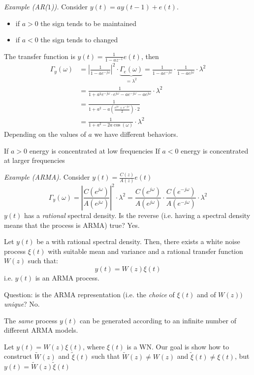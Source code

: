 \emph{Example (AR($1$)).}
Consider $y(t)=ay(t-1)+e(t)$.
\begin{itemize}
	\item if $a>0$ the sign tends to be maintained
	\item if $a<0$ the sign tends to changed
\end{itemize}
The transfer function is $y(t)=\frac{1}{1-az^{-1} }e(t)$, then
\begin{align*}
	\Gamma _{y}(\omega )&=\left|\frac{1}{1-ae^{-j\omega } }\right|^2 \cdot\underbrace{\Gamma _{e}(\omega )}_{=\lambda^2 } = \frac{1}{1-ae^{-j\omega}}\cdot\frac{1}{1-ae^{j\omega}} \cdot\lambda^2\\
	&=\frac{1}{1+a^2 e^{-j\omega }\cdot e^{j\omega }-ae^{-j\omega}-ae^{j\omega}} \cdot \lambda^2\\
	&=\frac{1}{1+a^2 -a\left( \frac{e^{j\omega}+e^{-j\omega}}{2} \right)\cdot 2}\\
	&=\frac{1}{1+a^2-2a\cos (\omega)} \cdot\lambda^2
\end{align*}
Depending on the values of $a$ we have different behaviors.

If $a>0$ energy is concentrated at low frequencies
If $a<0$ energy is concentrated at larger frequencies

\emph{Example (ARMA).}
Consider $y(t)=\frac{C(z)}{A(z)}e(t)$
\[
	\Gamma _{y}(\omega )=\left|\frac{C(e^{j\omega})}{A(e^{j\omega})}\right|^2 \cdot\lambda^2 =\frac{C(e^{j\omega})}{A(e^{j\omega} )} \cdot \frac{C(e^{-j\omega})}{A(e^{-j\omega} )}\cdot\lambda^2 
\]
$y(t)$ has a \emph{rational} spectral density. Is the reverse (i.e. having a spectral density means that the process is ARMA) true? Yes.

\begin{theorem}
	Let $y(t)$ be a \ssp with rational spectral density.
	Then, there exists a white noise process $\xi(t)$ with suitable mean and variance and a rational transfer function $W(z)$ such that:
	\[
		y(t)=W(z)\xi(t)
	\]
	i.e. $y(t)$ is an ARMA process.
\end{theorem}

Question: is the ARMA representation (i.e. the \emph{choice} of $\xi(t)$ and of $W(z))$ \emph{unique}? No.

The \emph{same} process $y(t)$ can be generated according to an infinite number of different ARMA models.

Let $y(t)=W(z)\xi(t)$, where $\xi(t)$ is a WN. Our goal is show how to construct $\tilde{W}(z)$ and $\tilde{\xi}(t)$ such that $\tilde{W}(z)\neq W(z)$ and $\tilde{\xi}(t)\neq \xi(t)$, but $y(t)=\tilde W(z)\tilde\xi(t)$

